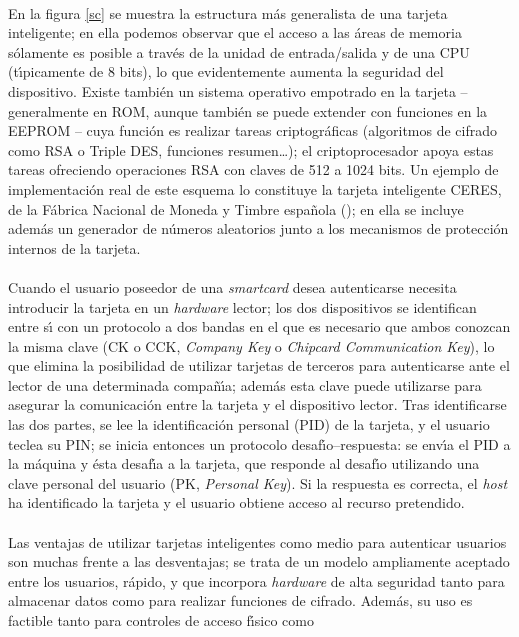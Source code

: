 \\En la figura \ref{sc} se muestra la estructura m\'as generalista de una 
tarjeta inteligente; en ella podemos observar que el acceso a las \'areas de
memoria s\'olamente es posible a trav\'es de la unidad de entrada/salida y de
una CPU (t\'{\i}picamente de 8 bits), lo que evidentemente aumenta la seguridad 
del dispositivo. Existe tambi\'en
un sistema operativo empotrado en la tarjeta -- generalmente en ROM, aunque 
tambi\'en se puede extender con funciones en la EEPROM -- cuya funci\'on es
realizar tareas criptogr\'aficas (algoritmos de cifrado como RSA o Triple
DES, funciones resumen\ldots); el criptoprocesador apoya estas tareas ofreciendo
operaciones RSA con claves de 512 a 1024 bits. Un ejemplo de implementaci\'on 
real de este esquema lo constituye la tarjeta inteligente CERES, de la F\'abrica
Nacional de Moneda y Timbre espa\~nola (\cite{kn:pit99}); en ella se incluye
adem\'as un generador de n\'umeros aleatorios junto a los mecanismos de 
protecci\'on internos de la tarjeta.\\
\\Cuando el usuario poseedor de una {\it smartcard} desea autenticarse necesita
introducir la tarjeta en un {\it hardware} lector; los dos dispositivos se 
identifican entre s\'{\i} con un protocolo a dos bandas en el que es necesario
que ambos conozcan la misma clave (CK o CCK, {\it Company Key} o {\it Chipcard
Communication Key}), lo que elimina la posibilidad de utilizar tarjetas de
terceros para autenticarse ante el lector de una determinada compa\~n\'{\i}a;
adem\'as esta clave puede utilizarse para asegurar la comunicaci\'on entre
la tarjeta y el dispositivo lector. Tras identificarse las dos partes, se lee
la identificaci\'on personal (PID) de la tarjeta, y el usuario teclea su
PIN; se inicia entonces un protocolo desaf\'{\i}o--respuesta: se env\'{\i}a 
el PID a la m\'aquina y \'esta desaf\'{\i}a a la tarjeta, que responde al
desaf\'{\i}o utilizando una clave personal del usuario (PK, {\it Personal 
Key}). Si la respuesta es correcta, el {\it host} ha identificado la tarjeta y 
el usuario obtiene acceso al recurso pretendido.\\
\\Las ventajas de utilizar tarjetas inteligentes como medio para autenticar
usuarios son muchas frente a las desventajas; se trata de un modelo ampliamente
aceptado entre los usuarios, r\'apido, y que incorpora {\it hardware} de alta
seguridad tanto para almacenar datos como para realizar funciones de cifrado.
Adem\'as, su uso es factible tanto para controles de acceso f\'{\i}sico como 
